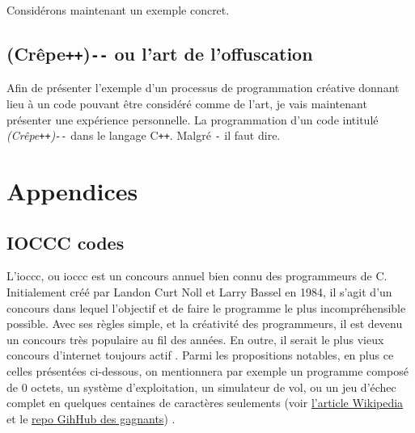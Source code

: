 \documentclass[12pt]{article} %
\newcommand{\p}{\texttt{+}} %
\newcommand{\doublep}{\texttt{++}} %
\newcommand{\m}{\texttt{-} \space} %
\newcommand{\doublem}{\texttt{-}\texttt{-} \space} %
\begin{document}
Considérons maintenant un exemple concret. %



\subsection{(Crêpe\doublep)\doublem ou l'art de l'offuscation}
Afin de présenter l'exemple d'un processus de programmation créative donnant lieu à un code pouvant être considéré comme de l'art, je vais maintenant présenter une expérience personnelle. La programmation d'un code intitulé \textit{(Crêpe\doublep)\doublem} dans le langage C\p\p. Malgré \m il faut dire. 


\newpage
\section{Appendices}

\subsection{IOCCC codes}

L'\acrshort{ioccc}, ou \acrlong{ioccc} est un concours annuel bien connu des programmeurs de C. Initialement créé par Landon Curt Noll et Larry Bassel en 1984, il s'agit d'un concours dans lequel l'objectif et de faire le programme le plus incompréhensible possible. Avec ses règles simple, et la créativité des programmeurs, il est devenu un concours très populaire au fil des années. En outre, il serait le plus vieux concours d'internet toujours actif \cite{IOCCC-readme-github}. Parmi les propositions notables, en plus ce celles présentées ci-dessous, on mentionnera par exemple un programme composé de 0 octets, un système d'exploitation, un simulateur de vol, ou un jeu d'échec complet en quelques centaines de caractères seulements (voir \href{https://en.wikipedia.org/wiki/International_Obfuscated_C_Code_Contest}{l'article Wikipedia} et le \href{https://github.com/ioccc-src/winner}{repo GihHub des gagnants}) \cite{Wikipedia-IOCCC} \cite{IOCCC-homepage}.
\end{document}

